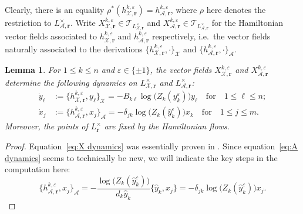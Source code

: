 \documentclass{amsart}
\newtheorem{lemma}[theorem]{Lemma}
\numberwithin{equation}{section}
\newcommand{\bfr}{{\boldsymbol{r}}}
\newcommand{\cA}{\mathcal{A}}
\newcommand{\cT}{\mathcal{T}}
\newcommand{\cX}{\mathcal{X}}
\begin{document}
Clearly, there is an equality $\rho^*(h_{\cX,\bfr}^{k,\varepsilon})=h_{\cA,\bfr}^{k,\varepsilon}$, where $\rho$ here denotes the restriction to $L^\times_{\cA,\bfr}$.
Write $X_{\cX,\bfr}^{k,\varepsilon}\in\cT_{L^\times_{\cX,\bfr}}$ and $X_{\cA,\bfr}^{k,\varepsilon}\in\cT_{L^\times_{\cA,\bfr}}$ for the Hamiltonian vector fields associated to $h_{\cX,\bfr}^{k,\varepsilon}$ and $h_{\cA,\bfr}^{k,\varepsilon}$ respectively, i.e.\ the vector fields naturally associated to the derivations $\{h_{\cX,\bfr}^{k,\varepsilon},\cdot\}_\cX$ and $\{h_{\cA,\bfr}^{k,\varepsilon},\cdot\}_\cA$.
\begin{lemma}
  \label{le:hamiltonian dynamics}
  For $1\le k\le n$ and $\varepsilon\in\{\pm1\}$, the vector fields $X_{\cX,\bfr}^{k,\varepsilon}$ and $X_{\cA,\bfr}^{k,\varepsilon}$ determine the following dynamics on $L^\times_{\cX,\bfr}$ and $L^\times_{\cA,\bfr}$:
  \begin{align}
    \label{eq:X dynamics}
    \dot y_\ell&:=\{h_{\cX,\bfr}^{k,\varepsilon},y_\ell\}_\cX=-B_{k\ell}\log\big(Z_k(y_k^\varepsilon)\big)y_\ell\quad\text{for}\quad 1\le\ell\le n;\\
    \label{eq:A dynamics}
    \dot x_j&:=\{h_{\cA,\bfr}^{k,\varepsilon},x_j\}_\cA=-\delta_{jk}\log\big(Z_k(\hat y_k^\varepsilon)\big)x_k\quad\text{for}\quad 1\le j\le m.
  \end{align}
  Moreover, the points of $L^\times_\bfr$ are fixed by the Hamiltonian flows.
\end{lemma}
\begin{proof}
  Equation~\eqref{eq:X dynamics} was essentially proven in \cite{GNR17}.
  Since equation~\eqref{eq:A dynamics} seems to technically be new, we will indicate the key steps in the computation here:
  \[\{h_{\cA,\bfr}^{k,\varepsilon},x_j\}_\cA=-\frac{\log\big(Z_k(\hat y_k^\varepsilon)\big)}{d_k\hat y_k}\{\hat y_k,x_j\}=-\delta_{jk}\log\big(Z_k(\hat y_k^\varepsilon)\big)x_j.\]
\end{proof}
\end{document}
